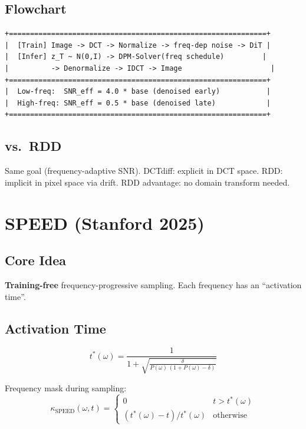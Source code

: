 \documentclass[11pt, a4paper]{article}
\begin{document}
\subsection{Flowchart}

\begin{lstlisting}[style=flowchart, caption={DCTdiff Pipeline}]
+=============================================================+
|  [Train] Image -> DCT -> Normalize -> freq-dep noise -> DiT |
|  [Infer] z_T ~ N(0,I) -> DPM-Solver(freq schedule)         |
|          -> Denormalize -> IDCT -> Image                     |
+=============================================================+
|  Low-freq:  SNR_eff = 4.0 * base (denoised early)           |
|  High-freq: SNR_eff = 0.5 * base (denoised late)            |
+=============================================================+
\end{lstlisting}

\subsection{vs.\ RDD}

Same goal (frequency-adaptive SNR). DCTdiff: explicit in DCT space. RDD: implicit in pixel space via drift. RDD advantage: no domain transform needed.

\newpage
\section{SPEED (Stanford 2025)}

\subsection{Core Idea}
\textbf{Training-free} frequency-progressive sampling. Each frequency has an ``activation time''.

\subsection{Activation Time}

\begin{equation}
    \boxed{t^*(\omega) = \frac{1}{1 + \sqrt{\frac{\delta}{P(\omega)\,(1+P(\omega)-\delta)}}}}
\end{equation}

Frequency mask during sampling:
\begin{equation}
    \kappa_{\mathrm{SPEED}}(\omega, t) = \begin{cases} 0 & t > t^*(\omega) \\ (t^*(\omega)-t)/t^*(\omega) & \text{otherwise} \end{cases}
\end{equation}
\end{document}
